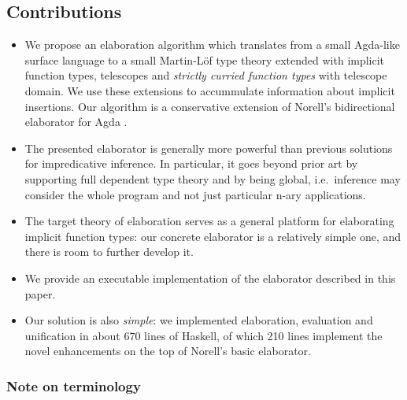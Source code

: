 \documentclass[acmsmall,review,anonymous,prologue,dvipsnames]{acmart}\settopmatter{printfolios=true,printccs=false,printacmref=false}
\theoremstyle{remark}
\begin{document}
\subsection{Contributions}
\begin{itemize}
  \item We propose an elaboration algorithm which translates from a small
    Agda-like surface language to a small Martin-L\"of type theory extended with
    implicit function types, telescopes and \emph{strictly curried function
      types} with telescope domain. We use these extensions to accummulate
    information about implicit insertions. Our algorithm is a conservative
    extension of Norell's bidirectional elaborator for Agda
    \cite[Chapter~3]{norell07thesis}.
  \item The presented elaborator is generally more powerful than previous
    solutions for impredicative inference. In particular, it goes beyond prior
    art by supporting full dependent type theory and by being global,
    i.e.\ inference may consider the whole program and not just particular n-ary
    applications.
  \item The target theory of elaboration serves as a general platform for
    elaborating implicit function types: our concrete elaborator is a relatively
    simple one, and there is room to further develop it.
  \item We provide an executable implementation of the elaborator described in
    this paper.
  \item Our solution is also \emph{simple}: we implemented elaboration,
    evaluation and unification in about 670 lines of Haskell, of which 210 lines
    implement the novel enhancements on the top of Norell's basic elaborator.
\end{itemize}

\subsubsection{Note on terminology}
\end{document}
